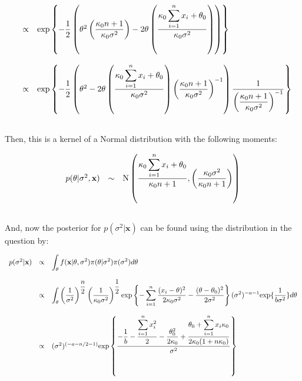 \documentclass{article}
\begin{document}
\begin{equation*}
\begin{array}{lcl ll }

& \propto & \mbox{exp}\left\{ - \dfrac{1}{2} \left( \theta^2 \left(\dfrac{\kappa_0n + 1}{\kappa_0\sigma^2}\right) -2\theta \left(\dfrac{\kappa_0\displaystyle\sum_{i=1}^{n}x_{i} + \theta_0}{\kappa_0\sigma^2}\right) \right)\right\} \\\\

& \propto & \mbox{exp}\left\{ - \dfrac{1}{2} \left( \theta^2 -2\theta \left(\dfrac{\kappa_0\displaystyle\sum_{i=1}^{n}x_{i} + \theta_0}{\kappa_0\sigma^2}\right)\left(\dfrac{\kappa_0n + 1}{\kappa_0\sigma^2}\right)^{-1} \right) \dfrac{1}{\left(\dfrac{\kappa_0n + 1}{\kappa_0\sigma^2}\right)^{-1} }\right\} \\\\

 \end{array}
\end{equation*}

Then, this is a kernel of a Normal distribution with the following moments:

\begin{equation*}
\begin{array}{lcl ll }

p(\theta|\sigma^2,\textbf{x}) & \sim &  \mbox{N}\left( \dfrac{\kappa_0\displaystyle\sum_{i=1}^{n}x_{i} + \theta_0}{\kappa_0n + 1} , \left(\dfrac{\kappa_0\sigma^2}{\kappa_0n + 1}\right) \right)  \\\\

 \end{array}
\end{equation*}


And, now the posterior for $p(\sigma^2|\textbf{x})$ can be found using the distribution in the question by:

\begin{equation*}
\begin{array}{lcl ll }
p(\sigma^2|\textbf{x}) & \propto & \displaystyle\int_{\theta}f(\textbf{x}|\theta, \sigma^2) \pi(\theta|\sigma^2)\pi(\sigma^2)d\theta\\ \\

& \propto & \displaystyle\int_{\theta}\left(\dfrac{1}{\sigma^2}\right)^{\dfrac{n}{2}} \left(\dfrac{1}{\kappa_0\sigma^2}\right)^{\dfrac{1}{2}} \mbox{exp}\left\{ - \displaystyle\sum_{i=1}^{n}\frac{(x_{i} - \theta)^2}{2\kappa_0\sigma^2} - \dfrac{(\theta - \theta_0)^2}{2\sigma^2} \right\} (\sigma^2)^{-a-1}\mbox{exp} \{\dfrac{1}{b\sigma^2} \} d\theta\\\\

& \propto & (\sigma^2)^{(-a-n/2-1)} \mbox{exp}\left\{\dfrac{-\dfrac{1}{b} - \dfrac{\displaystyle\sum_{i=1}^{n}x_{i}^2}{2} - \dfrac{\theta_0^2}{2\kappa_0} + \dfrac{\theta_0 + \displaystyle\sum_{i=1}^{n}x_{i}\kappa_0}{2\kappa_0(1+n\kappa_0)}}{\sigma^2}  \right\}\\\\

 \end{array}
\end{equation*}
\end{document}
